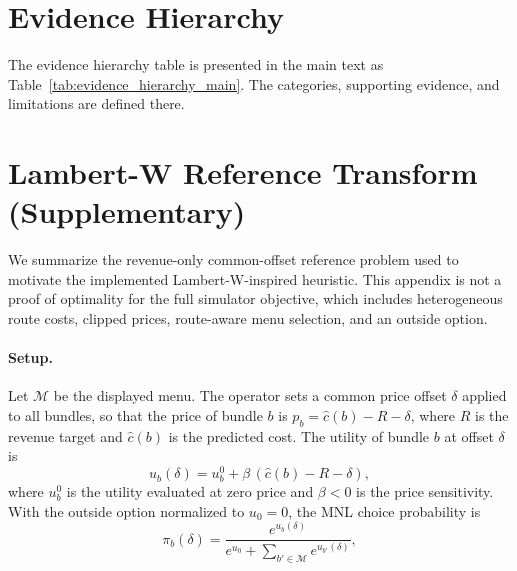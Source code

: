 \section{Evidence Hierarchy}
\label{app:evidence_hierarchy}

The evidence hierarchy table is presented in the main text as Table~\ref{tab:evidence_hierarchy_main}. The categories, supporting evidence, and limitations are defined there.



\section{Lambert-W Reference Transform (Supplementary)}
\label{app:lambertw}

We summarize the revenue-only common-offset reference problem used to motivate the implemented Lambert-W-inspired heuristic. This appendix is not a proof of optimality for the full simulator objective, which includes heterogeneous route costs, clipped prices, route-aware menu selection, and an outside option.

\paragraph{Setup.} Let $\mathcal{M}$ be the displayed menu. The operator sets a common price offset $\delta$ applied to all bundles, so that the price of bundle $b$ is $p_b = \hat{c}(b) - R - \delta$, where $R$ is the revenue target and $\hat{c}(b)$ is the predicted cost. The utility of bundle $b$ at offset $\delta$ is
\[
  u_b(\delta) = u_b^0 + \beta\,(\hat{c}(b) - R - \delta),
\]
where $u_b^0$ is the utility evaluated at zero price and $\beta < 0$ is the price sensitivity. With the outside option normalized to $u_0 = 0$, the MNL choice probability is
\[
  \pi_b(\delta) = \frac{e^{u_b(\delta)}}{e^{u_0} + \sum_{b' \in \mathcal{M}} e^{u_{b'}(\delta)}},
\]

